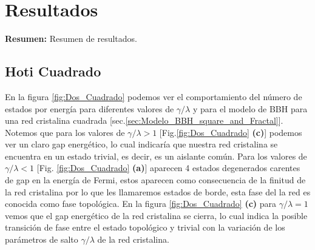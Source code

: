 \chapter{Resultados}

\begin{center}
\begin{minipage}{0.9\textwidth}
{\small
{\bf Resumen:} Resumen de resultados.
}
\end{minipage}
\end{center}




\section{Hoti Cuadrado}

En la figura \ref{fig:Dos_Cuadrado} podemos ver el comportamiento del número de estados por energía para diferentes valores de $\gamma/\lambda$ y para el modelo de BBH para una red cristalina cuadrada [sec.\ref{sec:Modelo_BBH_square_and_Fractal}]. Notemos que para los valores de $\gamma/\lambda>1$ [Fig.\ref{fig:Dos_Cuadrado} \textbf{(c)}] podemos ver un claro gap energético, lo cual indicaría que nuestra red cristalina se encuentra en un estado trivial, es decir, es un aislante común. Para los valores de $\gamma/\lambda<1$ [Fig. \ref{fig:Dos_Cuadrado} \textbf{(a)}] aparecen 4 estados degenerados carentes de gap en la energía de Fermi, estos aparecen como consecuencia de la finitud de la red cristalina por lo que les llamaremos estados de borde, esta fase del la red es conocida como fase topológica. En la figura \ref{fig:Dos_Cuadrado} \textbf{(c)} para $\gamma/\lambda = 1$ vemos que el gap energético de la red cristalina se cierra, lo cual indica la posible transición de fase entre el estado topológico y trivial con la variación de los parámetros de salto $\gamma/\lambda$ de la red cristalina.


